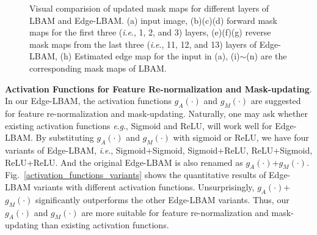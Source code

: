 \documentclass[10pt,journal,compsoc]{IEEEtran}
\newcommand{\ie}{\textit{i}.\textit{e}.}
\newcommand{\eg}{\textit{e}.\textit{g}.}
\begin{document}
\begin{figure}[hbt]
	\caption{Visual comparision of updated mask maps for different layers of LBAM and Edge-LBAM. (a) input image, (b)(c)(d) forward mask maps for the first three (\ie, 1, 2, and 3) layers, (e)(f)(g) reverse mask maps from the last three (\ie, 11, 12, and 13) layers of Edge-LBAM, (h) Estimated edge map for the input in (a), (i)$\sim$(n) are the corresponding mask maps of LBAM.}
	\label{mask-updating}
\end{figure}
{\textbf{Activation Functions for Feature Re-normalization and Mask-updating}.}
%
In our Edge-LBAM, the activation functions $g_A(\cdot)$ and $g_M(\cdot)$ are suggested for feature re-normalization and mask-updating.
%
Naturally, one may ask whether existing activation functions \eg, Sigmoid and ReLU, will work well for Edge-LBAM.
%
By substituting $g_A(\cdot)$ and $g_M(\cdot)$ with sigmoid or ReLU, we have four variants of Edge-LBAM, \ie, Sigmoid+Sigmoid, Sigmoid+ReLU, ReLU+Sigmoid, ReLU+ReLU.
%
And the original Edge-LBAM is also renamed as $g_A(\cdot)$+$g_M(\cdot)$.
%
Fig.~\ref{activation_functions_variants} {shows} the quantitative results of Edge-LBAM variants with different activation functions.
%
Unsurprisingly, $g_A(\cdot)$+$g_M(\cdot)$ significantly outperforms the other Edge-LBAM variants.  %
Thus, our $g_A(\cdot)$ and $g_M(\cdot)$ are more suitable for feature re-normalization and mask-updating than existing activation functions.
%
%
%
%
%
%
%
\end{document}
